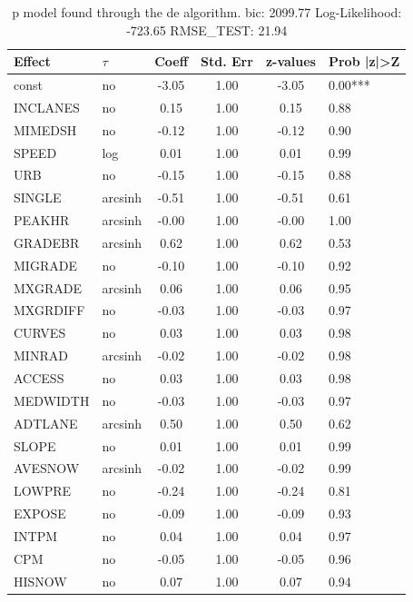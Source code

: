 \begin{table}
	\caption{p model found through the de algorithm. bic: 2099.77 Log-Likelihood: -723.65 RMSE_TEST: 21.94}
	\begin{center}
		\begin{tabular}{|l|l|c|c|c|l|}
			\hline
			Effect & $\tau$ & Coeff & Std. Err & z-values & Prob |z|>Z \\
			\hline
			const & no & -3.05 & 1.00 & -3.05 & 0.00*** \\
			\hline
			INCLANES & no & 0.15 & 1.00 & 0.15 & 0.88 \\
			\hline
			MIMEDSH & no & -0.12 & 1.00 & -0.12 & 0.90 \\
			\hline
			SPEED & log & 0.01 & 1.00 & 0.01 & 0.99 \\
			\hline
			URB & no & -0.15 & 1.00 & -0.15 & 0.88 \\
			\hline
			SINGLE & arcsinh & -0.51 & 1.00 & -0.51 & 0.61 \\
			\hline
			PEAKHR & arcsinh & -0.00 & 1.00 & -0.00 & 1.00 \\
			\hline
			GRADEBR & arcsinh & 0.62 & 1.00 & 0.62 & 0.53 \\
			\hline
			MIGRADE & no & -0.10 & 1.00 & -0.10 & 0.92 \\
			\hline
			MXGRADE & arcsinh & 0.06 & 1.00 & 0.06 & 0.95 \\
			\hline
			MXGRDIFF & no & -0.03 & 1.00 & -0.03 & 0.97 \\
			\hline
			CURVES & no & 0.03 & 1.00 & 0.03 & 0.98 \\
			\hline
			MINRAD & arcsinh & -0.02 & 1.00 & -0.02 & 0.98 \\
			\hline
			ACCESS & no & 0.03 & 1.00 & 0.03 & 0.98 \\
			\hline
			MEDWIDTH & no & -0.03 & 1.00 & -0.03 & 0.97 \\
			\hline
			ADTLANE & arcsinh & 0.50 & 1.00 & 0.50 & 0.62 \\
			\hline
			SLOPE & no & 0.01 & 1.00 & 0.01 & 0.99 \\
			\hline
			AVESNOW & arcsinh & -0.02 & 1.00 & -0.02 & 0.99 \\
			\hline
			LOWPRE & no & -0.24 & 1.00 & -0.24 & 0.81 \\
			\hline
			EXPOSE & no & -0.09 & 1.00 & -0.09 & 0.93 \\
			\hline
			INTPM & no & 0.04 & 1.00 & 0.04 & 0.97 \\
			\hline
			CPM & no & -0.05 & 1.00 & -0.05 & 0.96 \\
			\hline
			HISNOW & no & 0.07 & 1.00 & 0.07 & 0.94 \\

\end{tabular}
\end{center}
\end{table}
